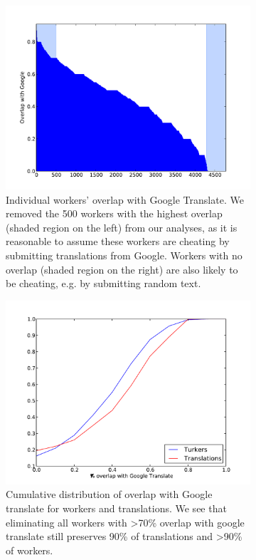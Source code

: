 \documentclass[11pt]{article}
\begin{document}
\begin{figure}[h!]
\centering
\begin{subfigure}[b]{\linewidth}
\includegraphics[width=\linewidth]{figures/turker-googmatch-distribution.pdf}
\caption{Individual workers' overlap with Google Translate. We removed the 500 workers with the highest overlap (shaded region on the left) from our analyses, as it is reasonable to assume these workers are cheating by submitting translations from Google. Workers with no overlap (shaded region on the right) are also likely to be cheating, e.g. by submitting random text. }
\label{dist}
\end{subfigure}
\begin{subfigure}[b]{\linewidth}
\includegraphics[width=\linewidth]{figures/google-cdf-googlangs.pdf}
\caption{Cumulative distribution of overlap with Google translate for workers and translations. We see that eliminating all workers with \textgreater 70\% overlap with google translate still preserves 90\% of translations and \textgreater 90\% of workers.}
\label{cdf}
\end{subfigure}
\caption{}\label{cheaters}
\end{figure}
\end{document}
